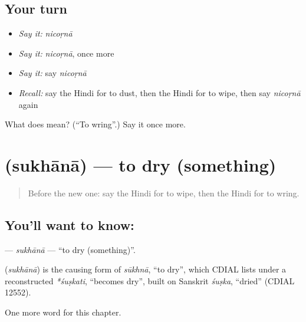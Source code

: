 \subsection*{Your turn}
\begin{itemize}
\raggedright
  \item \emph{Say it:} \emph{nicoṛnā}
  \item \emph{Say it:} \emph{nicoṛnā}, once more
  \item \emph{Say it:} say \emph{nicoṛnā}
  \item \emph{Recall:} say the Hindi for to dust, then the Hindi for to wipe, then say \emph{nicoṛnā} again
\end{itemize}

\begin{tcolorbox}[breakable,colback=teal!4,colframe=teal!35!black,title={Before you move on}]
What does  mean? (\textquotedblleft{}To wring\textquotedblright{}.) Say it once more.
\end{tcolorbox}
\section[\texorpdfstring{\hi{सुखाना} (sukhānā)}{सुखाना (sukhānā)}]{ (sukhānā) — to dry (something)}

\label{lesson:HI-C225-sukhana}



\begin{quote}
Before the new one: say the Hindi for to wipe, then the Hindi for to wring.
\end{quote}

\subsection*{You'll want to know: }
\textbf{} — \emph{sukhānā} — \textquotedblleft{}to dry (something)\textquotedblright{}.

\begin{cousinweb}
\textbf{} (\emph{sukhānā}) is the causing form of \emph{sūkhnā}, \textquotedblleft{}to dry\textquotedblright{}, which CDIAL lists under a reconstructed \emph{*śuṣkati}, \textquotedblleft{}becomes dry\textquotedblright{}, built on Sanskrit \emph{śuṣka}, \textquotedblleft{}dried\textquotedblright{} (CDIAL 12552).
\end{cousinweb}

\begin{grammarlens}[title={What you've built}]
One more word for this chapter.
\end{grammarlens}

